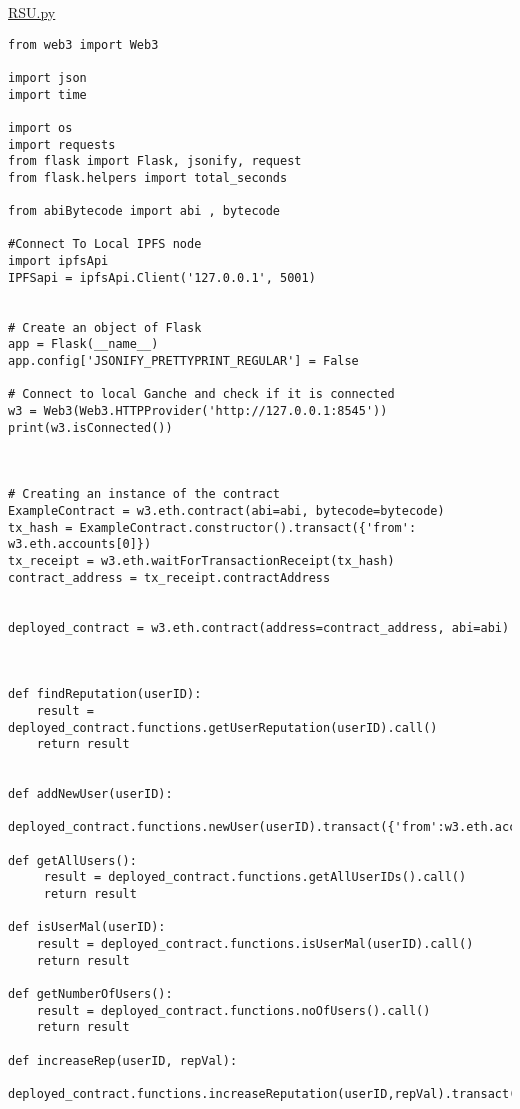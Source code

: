 
\begin{linenumbers}
\begin{lstlisting}

\end{lstlisting}
\resetlinenumber[1]
\hypertarget{milp_code}{}
\hyperlink{milp_text}{RSU.py}
\begin{lstlisting}
from web3 import Web3

import json
import time

import os
import requests
from flask import Flask, jsonify, request
from flask.helpers import total_seconds

from abiBytecode import abi , bytecode

#Connect To Local IPFS node
import ipfsApi
IPFSapi = ipfsApi.Client('127.0.0.1', 5001)


# Create an object of Flask 
app = Flask(__name__)
app.config['JSONIFY_PRETTYPRINT_REGULAR'] = False

# Connect to local Ganche and check if it is connected
w3 = Web3(Web3.HTTPProvider('http://127.0.0.1:8545'))
print(w3.isConnected())



# Creating an instance of the contract
ExampleContract = w3.eth.contract(abi=abi, bytecode=bytecode)
tx_hash = ExampleContract.constructor().transact({'from': w3.eth.accounts[0]})
tx_receipt = w3.eth.waitForTransactionReceipt(tx_hash)
contract_address = tx_receipt.contractAddress


deployed_contract = w3.eth.contract(address=contract_address, abi=abi)



def findReputation(userID):
    result = deployed_contract.functions.getUserReputation(userID).call()
    return result


def addNewUser(userID):
    deployed_contract.functions.newUser(userID).transact({'from':w3.eth.accounts[0]})

def getAllUsers():
     result = deployed_contract.functions.getAllUserIDs().call()
     return result

def isUserMal(userID):
    result = deployed_contract.functions.isUserMal(userID).call()
    return result

def getNumberOfUsers():
    result = deployed_contract.functions.noOfUsers().call()
    return result

def increaseRep(userID, repVal):
    deployed_contract.functions.increaseReputation(userID,repVal).transact({'from':w3.eth.accounts[0]})


\end{lstlisting}
\end{linenumbers}
